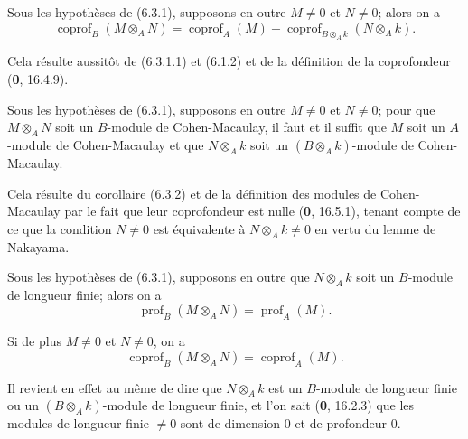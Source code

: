 \begin{corollary}[6.3.2]
\label{IV.2.s6.3.2-fr}
Sous les hypothèses de \textup{(6.3.1)}, supposons en outre $M\neq0$ et $N\neq0$;
alors on a
\begin{equation}
\operatorname{coprof}_B(M\otimes_AN)=\operatorname{coprof}_A(M)
+\operatorname{coprof}_{B\otimes_Ak}(N\otimes_Ak).
\tag{6.3.2.1}\label{IV.2.s6.3.2.1-fr}
\end{equation}
\end{corollary}

Cela résulte aussitôt de (6.3.1.1) et (6.1.2) et de la définition de la
coprofondeur (\textbf{0}, 16.4.9).

\begin{corollary}[6.3.3]
\label{IV.2.s6.3.3-fr}
Sous les hypothèses de \textup{(6.3.1)}, supposons en outre $M\neq0$ et $N\neq0$; pour
que $M\otimes_AN$ soit un $B$-module de Cohen-Macaulay, il faut et il suffit
que $M$ soit un $A$-module de Cohen-Macaulay et que $N\otimes_Ak$ soit un
$(B\otimes_Ak)$-module de Cohen-Macaulay.
\end{corollary}

Cela résulte du corollaire (6.3.2) et de la définition des modules de
Cohen-Macaulay par le fait que leur coprofondeur est nulle (\textbf{0}, 16.5.1), tenant
compte de ce que la condition $N\neq0$ est équivalente à $N\otimes_Ak\neq0$ en
vertu du lemme de Nakayama.

\begin{corollary}[6.3.4]
\label{IV.2.s6.3.4-fr}
Sous les hypothèses de \textup{(6.3.1)}, supposons en outre que $N\otimes_Ak$ soit un
$B$-module de longueur finie; alors on a
\begin{equation}
\operatorname{prof}_B(M\otimes_AN)=\operatorname{prof}_A(M).
\tag{6.3.4.1}\label{IV.2.s6.3.4.1-fr}
\end{equation}


Si de plus $M\neq0$ et $N\neq0$, on a
\begin{equation}
\operatorname{coprof}_B(M\otimes_AN)=\operatorname{coprof}_A(M).
\tag{6.3.4.2}\label{IV.2.s6.3.4.2-fr}
\end{equation}
\end{corollary}

Il revient en effet au même de dire que $N\otimes_Ak$ est un $B$-module de
longueur finie ou un $(B\otimes_Ak)$-module de longueur finie, et l'on sait
(\textbf{0}, 16.2.3) que les modules de longueur finie $\neq0$ sont de dimension $0$ et
de profondeur $0$.

